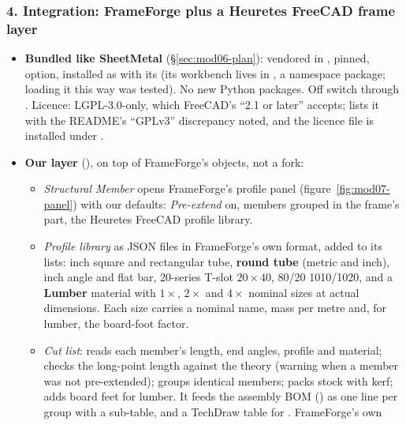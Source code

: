 \subsubsection*{4. Integration: FrameForge plus a Heuretes FreeCAD frame layer}

\begin{itemize}[nosep]
  \item \textbf{Bundled like SheetMetal} (\S\ref{sec:mod06-plan}): vendored in ,
        pinned,  option, installed as  with its 
        (its workbench lives in , a namespace package; loading it this way was tested). No new
        Python packages. Off switch through . Licence: LGPL-3.0-only, which FreeCAD's
        ``2.1 or later'' accepts;  lists it with the README's ``GPLv3'' discrepancy noted, and the licence
        file is installed under .
  \item \textbf{Our layer} (), on top of FrameForge's objects, not a fork:
        \begin{itemize}[nosep]
          \item \emph{Structural Member} opens FrameForge's profile panel (figure~\ref{fig:mod07-panel}) with our
                defaults: \emph{Pre-extend} on, members grouped in the frame's part, the Heuretes FreeCAD profile library.
          \item \emph{Profile library} as JSON files in FrameForge's own format, added to its lists: inch square and
                rectangular tube, \textbf{round tube} (metric and inch), inch angle and flat bar, 20-series T-slot
                $20\times40$, 80/20 1010/1020, and a \textbf{Lumber} material with $1\times$, $2\times$ and $4\times$
                nominal sizes at actual dimensions. Each size carries a nominal name, mass per metre and, for lumber,
                the board-foot factor.
          \item \emph{Cut list}: reads each member's length, end angles, profile and material; checks the long-point
                length against the theory (warning when a member was not pre-extended); groups identical members; packs
                stock with kerf; adds board feet for lumber. It feeds the assembly BOM () as one line per
                group with a  sub-table, and a TechDraw table for . FrameForge's own

\end{itemize}
\end{itemize}
